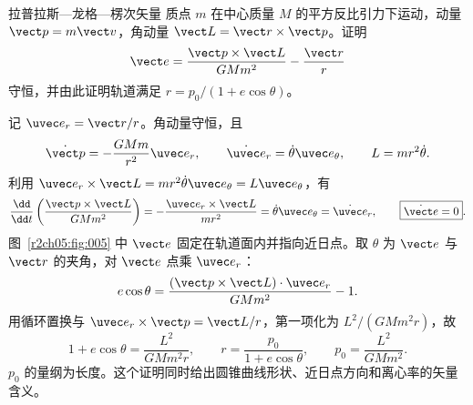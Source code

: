 \begin{practicebox}{拉普拉斯—龙格—楞次矢量}
质点 $m$ 在中心质量 $M$ 的平方反比引力下运动，动量 $\vect p=m\vect v$，角动量 $\vect L=\vect r\times\vect p$。证明
\[
 \vect e=\frac{\vect p\times\vect L}{GMm^2}-\frac{\vect r}{r}
\]
守恒，并由此证明轨道满足 $r=p_0/(1+e\cos\theta)$。
\label{r2ch05:pr:003}
\begin{solution}
记 $\uvec e_r=\vect r/r$。角动量守恒，且
\[
 \dot{\vect p}=-\frac{GMm}{r^2}\uvec e_r,\qquad
 \dot{\uvec e}_r=\dot\theta\uvec e_\theta,\qquad
 L=mr^2\dot\theta.
\]
利用 $\uvec e_r\times\vect L=mr^2\dot\theta\uvec e_\theta=L\uvec e_\theta$，有
\begin{equation}
 \frac{\dd}{\dd t}\left(\frac{\vect p\times\vect L}{GMm^2}\right)
 =-\frac{\uvec e_r\times\vect L}{mr^2}
 =\dot\theta\uvec e_\theta
 =\dot{\uvec e}_r,\qquad \boxed{\dot{\vect e}=0}.
 \label{r2ch05:eq:018}
\end{equation}
图~\ref{r2ch05:fig:005} 中 $\vect e$ 固定在轨道面内并指向近日点。取 $\theta$ 为 $\vect e$ 与 $\vect r$ 的夹角，对 $\vect e$ 点乘 $\uvec e_r$：
\[
 e\cos\theta
 =\frac{(\vect p\times\vect L)\cdot\uvec e_r}{GMm^2}-1.
\]
用循环置换与 $\uvec e_r\times\vect p=\vect L/r$，第一项化为 $L^2/(GMm^2r)$，故
\begin{equation}
 1+e\cos\theta=\frac{L^2}{GMm^2r},\qquad
 \boxed{r=\frac{p_0}{1+e\cos\theta}},\qquad
 p_0=\frac{L^2}{GMm^2}.
 \label{r2ch05:eq:019}
\end{equation}
$p_0$ 的量纲为长度。这个证明同时给出圆锥曲线形状、近日点方向和离心率的矢量含义。
\figLRLGeometry
\end{solution}
\end{practicebox}


